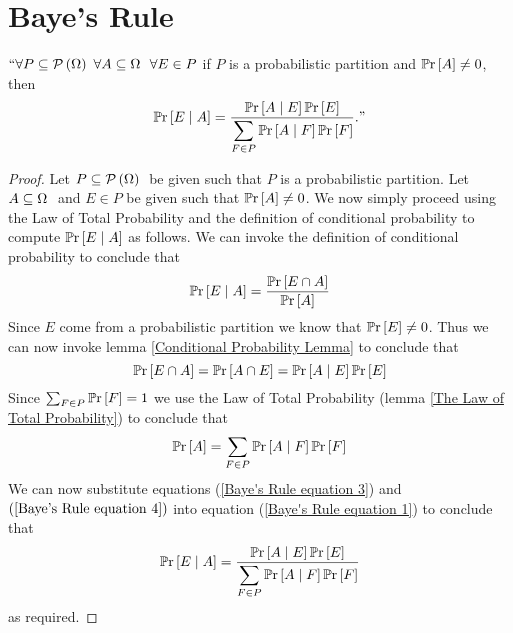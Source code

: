     \section{Baye's Rule}
        \begin{theorem}
            $``\forall P \subseteq \mathcal{P}\left(\Omega\right) \  \forall A \subseteq \Omega \  \ \forall E \in P$
            if $P$ is a probabilistic partition and $\mathbb{P}\mathrm{r} \left[A\right] \neq 0$, then 
            \[
                \mathbb{P}\mathrm{r}\left[E \mid A\right] = \dfrac{\mathbb{P}\mathrm{r}\left[A \mid E\right] \mathbb{P}\mathrm{r} \left[E\right]}{\displaystyle\sum_{F \in P} \mathbb{P}\mathrm{r}\left[A \mid F\right] \mathbb{P}\mathrm{r} \left[F\right]}."
            \]
        \end{theorem}
        \begin{proof}
            Let $P \subseteq \mathcal{P}\left(\Omega\right) \ $ be given such that $P$ is a probabilistic partition.
            Let $A \subseteq \Omega \ $ and $E \in P$ be given such that $\mathbb{P}\mathrm{r} \left[A\right] \neq 0$. We 
            now simply proceed using  the Law of Total Probability and the definition of
            conditional probability to compute $\mathbb{P}\mathrm{r}\left[E \mid A\right]$ as follows. We can 
            invoke the definition of conditional probability to conclude that
            \begin{equation}
                \mathbb{P}\mathrm{r}\left[E \mid A\right] = \frac{\mathbb{P}\mathrm{r} \left[E \cap A\right]}{\mathbb{P}\mathrm{r} \left[A\right]}
                \label{Baye's Rule equation 1}
            \end{equation}
            Since $E$ come from a probabilistic partition we know that $\mathbb{P}\mathrm{r} \left[E\right] \neq 0$.
            Thus we can now invoke lemma \ref{Conditional Probability Lemma} to conclude that
            \begin{equation}
                \mathbb{P}\mathrm{r} \left[E \cap A\right] = \mathbb{P}\mathrm{r} \left[A \cap E\right] = \mathbb{P}\mathrm{r}\left[A \mid E\right] \mathbb{P}\mathrm{r} \left[E\right]
                \label{Baye's Rule equation 3}
            \end{equation}
            Since $\sum_{F \in P} \mathbb{P}\mathrm{r} \left[F\right] = 1$ we use the Law of Total Probability
            (lemma \ref{The Law of Total Probability}) to conclude that
            \begin{equation}
                \mathbb{P}\mathrm{r} \left[A\right] = \sum_{F \in P} \mathbb{P}\mathrm{r}\left[A \mid F\right] \mathbb{P}\mathrm{r} \left[F\right]
                \label{Baye's Rule equation 4}
            \end{equation}
            We can now substitute equations (\ref{Baye's Rule equation 3})
            and $(\ref{Baye's Rule equation 4})$ into equation (\ref{Baye's Rule equation 1})
            to conclude that
            \[
                \mathbb{P}\mathrm{r}\left[E \mid A\right] = \frac{\mathbb{P}\mathrm{r}\left[A \mid E\right] \mathbb{P}\mathrm{r} \left[E\right]}{\displaystyle\sum_{F \in P} \mathbb{P}\mathrm{r}\left[A \mid F\right] \mathbb{P}\mathrm{r} \left[F\right]}
            \]
            as required. \QED
        \end{proof}
